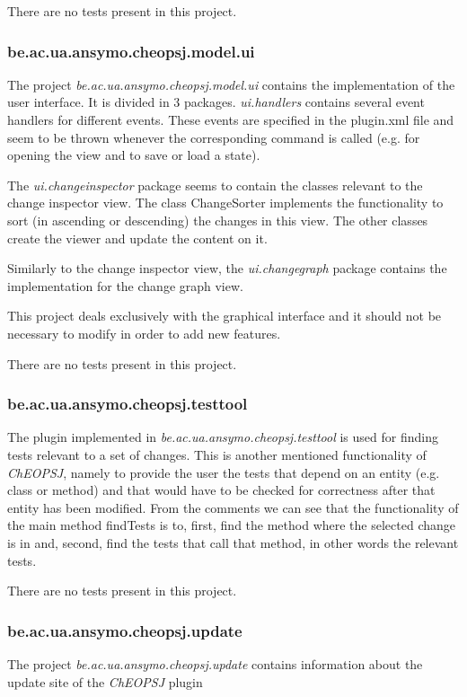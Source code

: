 \documentclass[a4paper]{article}
\begin{document}
There are no tests present in this project.

\subsubsection{be.ac.ua.ansymo.cheopsj.model.ui}
The project \emph{be.ac.ua.ansymo.cheopsj.model.ui} contains the implementation of the user interface. It is divided in 3 packages. \emph{ui.handlers} contains several event handlers for different events. These events are specified in the plugin.xml file and seem to be thrown whenever the corresponding command is called (e.g. for opening the view and to save or load a state).

The \emph{ui.changeinspector} package seems to contain the classes relevant to the change inspector view. The class ChangeSorter implements the functionality to sort (in ascending or descending) the changes in this view. The other classes create the viewer and update the content on it. 

Similarly to the change inspector view, the \emph{ui.changegraph} package contains the implementation for the change graph view.

This project deals exclusively with the graphical interface and it should not be necessary to modify in order to add new features.

There are no tests present in this project.

\subsubsection{be.ac.ua.ansymo.cheopsj.testtool}
The plugin implemented in \emph{be.ac.ua.ansymo.cheopsj.testtool} is used for finding tests relevant to a set of changes. This is another mentioned functionality of \emph{ChEOPSJ}, namely to provide the user the tests that depend on an entity (e.g. class or method) and that would have to be checked for correctness after that entity has been modified. From the comments we can see that the functionality of the main method findTests is to, first, find the method where the selected change is in and, second, find the tests that call that method, in other words the relevant tests.

There are no tests present in this project.

\subsubsection{be.ac.ua.ansymo.cheopsj.update}
The project \emph{be.ac.ua.ansymo.cheopsj.update} contains information about the update site of the \emph{ChEOPSJ} plugin
\end{document}
